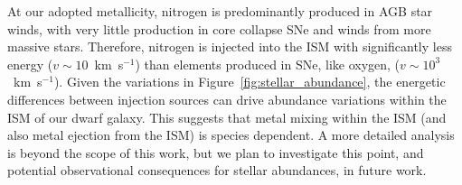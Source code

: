 \documentclass[twocolumn]{aastex61}
\begin{document}

At our adopted metallicity, nitrogen is predominantly produced in AGB star winds, with very little production in core collapse SNe and winds from more massive stars. Therefore, nitrogen is injected into the ISM with significantly less energy ($v \sim 10$~km~s$^{-1}$) than elements produced in SNe, like oxygen, ($v\sim 10^3$~km~s$^{-1}$). Given the variations in Figure~\ref{fig:stellar_abundance}, the energetic differences between injection sources can drive abundance variations within the ISM of our dwarf galaxy. This suggests that metal mixing within the ISM (and also metal ejection from the ISM) is species dependent. A more detailed analysis is beyond the scope of this work, but we plan to investigate this point, and potential observational consequences for stellar abundances, in future work. 

\end{document}
